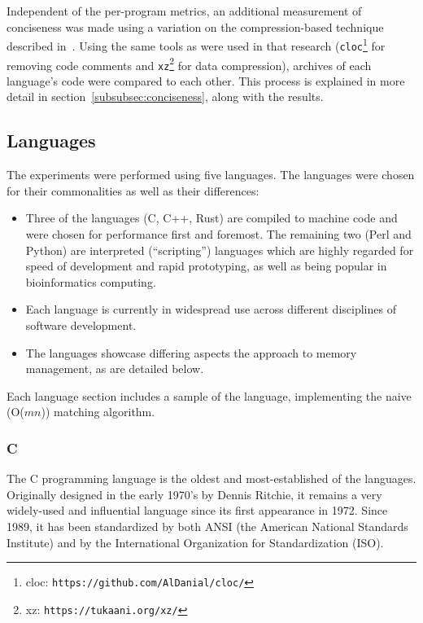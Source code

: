 Independent of the per-program metrics, an additional measurement of conciseness was made using a variation on the compression-based technique described in~\cite{bergmans}. Using the same tools as were used in that research (\texttt{cloc}\footnote{cloc: \texttt{https://github.com/AlDanial/cloc/}} for removing code comments and \texttt{xz}\footnote{xz: \texttt{https://tukaani.org/xz/}} for data compression), archives of each language's code were compared to each other. This process is explained in more detail in section~\ref{subsubsec:conciseness}, along with the results.

\subsection{Languages}
\label{subsec:languages}

The experiments were performed using five languages. The languages were chosen for their commonalities as well as their differences:

\begin{itemize}
\item Three of the languages (C, C++, Rust) are compiled to machine code and were chosen for performance first and foremost. The remaining two (Perl and Python) are interpreted (``scripting'') languages which are highly regarded for speed of development and rapid prototyping, as well as being popular in bioinformatics computing.
\item Each language is currently in widespread use across different disciplines of software development.
\item The languages showcase differing aspects the approach to memory management, as are detailed below.
\end{itemize}

Each language section includes a sample of the language, implementing the naive (O($mn$)) matching algorithm.

\subsubsection{C}

The C programming language is the oldest and most-established of the languages. Originally designed in the early 1970's by Dennis Ritchie, it remains a very widely-used and influential language since its first appearance in 1972. Since 1989, it has been standardized by both ANSI (the American National Standards Institute) and by the International Organization for Standardization (ISO).


